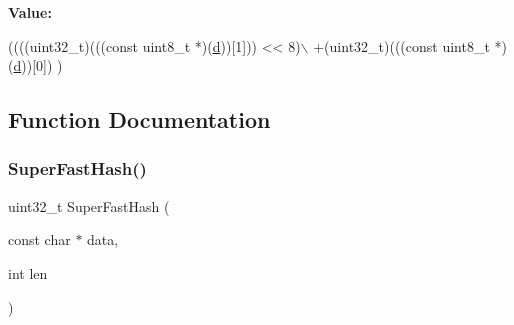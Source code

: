 {\bfseries Value\+:}
\begin{DoxyCode}
((((uint32\_t)(((\textcolor{keyword}{const} uint8\_t *)(\mbox{\hyperlink{alphabet_8_c_a6f364afbe132c4ecfea48bde1b0618ba}{d}}))[1])) << 8)\(\backslash\)
                       +(uint32\_t)(((\textcolor{keyword}{const} uint8\_t *)(\mbox{\hyperlink{alphabet_8_c_a6f364afbe132c4ecfea48bde1b0618ba}{d}}))[0]) )
\end{DoxyCode}


\subsection{Function Documentation}
\mbox{\label{super__fast__hash_8_c_a11d69a8cb5ac90dfb13d2e25df8eb1ce}} 
\subsubsection{\texorpdfstring{Super\+Fast\+Hash()}{SuperFastHash()}}
{\footnotesize\ttfamily uint32\+\_\+t Super\+Fast\+Hash (\begin{DoxyParamCaption}\item[{const char $\ast$}]{data,  }\item[{int}]{len }\end{DoxyParamCaption})}

